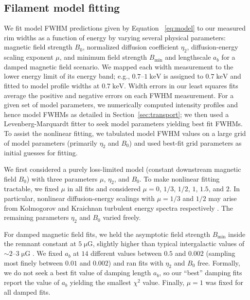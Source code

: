 \documentclass[manuscript]{aastex}  %
\newcommand*{\mt}{\mathrm}
\newcommand*{\unit}[1]{\;\mt{#1}}  %
\newcommand*{\abt}{\mathord{\sim}} %
\newcommand*{\Bmin}{B_{\mt{min}}}
\newcommand*{\muG}{\unit{\mu G}}
\begin{document}
\subsection{Filament model fitting}
\label{sec:fits}

We fit model FWHM predictions given by Equation~ \eqref{eq:model} to our
measured rim widths as a function of energy by varying several physical
parameters: magnetic field strength $B_0$, normalized diffusion coefficient
$\eta_2$, diffusion-energy scaling exponent $\mu$, and minimum field strength
$\Bmin$ and lengthscale $a_b$ for a damped magnetic field scenario.  We
mapped each width measurement to the lower energy limit of its energy band;
e.g., $0.7$--$1 \unit{keV}$ is assigned to $0.7 \unit{keV}$ and fitted to model
profile widths at $0.7 \unit{keV}$.  Width errors in our least squares fits
average the positive and negative errors on each FWHM measurement.  For a given
set of model parameters, we numerically computed intensity profiles and
hence model FWHMs as detailed in Section~\ref{sec:transport}; we then used a
Levenberg-Marquardt fitter to seek model parameters yielding best fit FWHMs.
To assist the nonlinear fitting, we tabulated model FWHM values on a large grid
of model parameters (primarily $\eta_2$ and $B_0$) and used best-fit grid
parameters as initial guesses for fitting.

We first considered a purely loss-limited model (constant downstream magnetic
field $B_0$) with three parameters $\mu$, $\eta_2$, and $B_0$.  To make
nonlinear fitting tractable, we fixed $\mu$ in all fits and considered $\mu =
0$, $1/3$, $1/2$, $1$, $1.5$, and $2$.  In particular, nonlinear
diffusion-energy scalings with $\mu = 1/3$ and $1/2$ may arise from Kolmogorov
and Kraichnan turbulent energy spectra respectively \citep{reynolds2004}.  The
remaining parameters $\eta_2$ and $B_0$ varied freely.

For damped magnetic field fits, we held the asymptotic field strength
$\Bmin$ inside the remnant constant at $5 \muG$, slightly higher than
typical intergalactic values of $\abt 2$--$3 \muG$ \citep{lyne1989, han2006}.
We fixed $a_b$ at $14$ different values between $0.5$ and $0.002$ (sampling
most finely between $0.01$ and $0.002$) and ran fits with $\eta_2$ and $B_0$
free.  Formally, we do not seek a best fit value of damping length $a_b$, so
our ``best'' damping fits report the value of $a_b$ yielding the smallest
$\chi^2$ value.  Finally, $\mu = 1$ was fixed for all damped fits.
\end{document}
